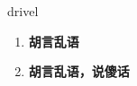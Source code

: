 
\begin{frame}
{\huge drivel}
\begin{center}
\begin{enumerate}\Large
  \item \textbf{胡言乱语}
  \item \textbf{胡言乱语，说傻话}
\end{enumerate}
\end{center}
\end{frame}
